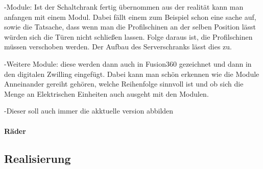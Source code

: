     -Module: Ist der Schaltchrank fertig übernommen aus der realität kann man anfangen mit einem Modul. Dabei fällt einem zum Beispiel schon eine sache auf, sowie die Tatsache, dass wenn man die Profilschinen an der selben Position lässt würden sich die Türen nicht schließen lassen. Folge daraus ist, die Profilschinen müssen verschoben werden. Der Aufbau des Serverschranks lässt dies zu.

    -Weitere Module: diese werden dann auch in Fusion360 gezeichnet und dann in den digitalen Zwilling eingefügt. Dabei kann man schön erkennen wie die Module Anneinander gereiht gehören, welche Reihenfolge sinnvoll ist und ob sich die Menge an Elektrischen Einheiten auch ausgeht mit den Modulen. 

    -Dieser soll auch immer die akktuelle version abbilden

    \paragraph{Räder}
\subsection{Realisierung}
\label{sec:Schaltplan}



